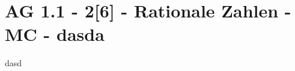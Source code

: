 \section{AG 1.1 - 2[6] - Rationale Zahlen - MC - dasda}

\begin{beispiel}[AG 1.1]{1}
dasd
\end{beispiel}
